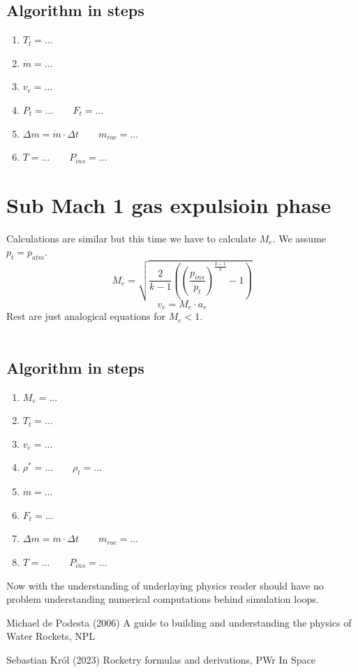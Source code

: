 \documentclass{report}
\begin{document}
\subsection*{Algorithm in steps}
\begin{enumerate}
\item $T_t = ...$
\item $\dot{m} = ...$
\item $v_e = ...$
\item $P_t = ...\qquad F_t = ...$
\item $\Delta m = \dot{m}\cdot \Delta t \qquad m_{roc} = ...$
\item $T = ...\qquad P_{ins} = ...$
\end{enumerate}

\section{Sub Mach 1 gas expulsioin phase}
Calculations are similar but this time we have to calculate $M_e$. We assume $p_t = p_{atm}$.
$$M_e = \sqrt{\frac{2}{k-1}\left(\left(\frac{p_{ins}}{p_t}\right)^{\frac{k-1}{k}}-1\right)}$$
$$v_e = M_e\cdot a_e$$
Rest are just analogical equations for $M_e < 1$.\\\\

\subsection*{Algorithm in steps}
\begin{enumerate}
\item $M_e=...$
\item $T_t = ...$
\item $v_e = ...$
\item $\rho^* = ... \qquad \rho_t = ...$
\item $\dot{m} = ...$
\item $F_t = ...$
\item $\Delta m = \dot{m}\cdot \Delta t \qquad m_{roc} = ...$
\item $T = ...\qquad P_{ins} = ...$
\end{enumerate}
Now with the understanding of underlaying physics reader should have no problem understanding numerical computations behind simulation loops.

\begin{thebibliography}{9}
Michael de Podesta (2006) A guide to building and understanding the physics of Water Rockets, NPL

Sebastian Król (2023) Rocketry formulas and derivations, PWr In Space
\end{thebibliography}
\end{document}
